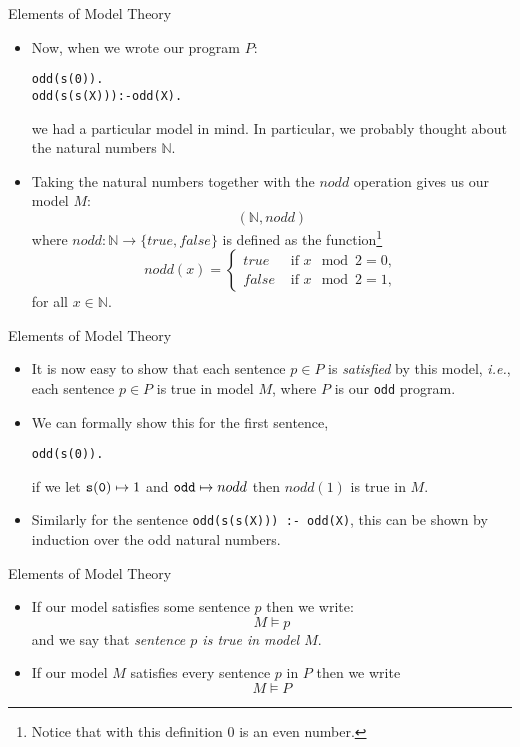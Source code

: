 \documentclass{beamer}
\begin{document}
\begin{frame}[fragile]{Elements of Model Theory}

\small
\begin{itemize}
\item 
Now, when we wrote our program $P$:
{\scriptsize
\begin{alltt}
odd(s(0)).
odd(s(s(X))) :- odd(X).
\end{alltt}
}
we had a particular model in mind.  In particular, we probably thought about the natural numbers $\mathbb{N}$.

\item
Taking the natural numbers together with the $nodd$ operation gives us our model $M$:
\[
(\mathbb{N}, nodd) %
\]
where $nodd : \mathbb{N} \rightarrow \{true,false\}$ is defined as the function\footnote{Notice that with this definition 0 is an even number.}
\[
nodd(x) = \left\{
\begin{array}{ll}
true & \mbox{ if $x\!\!\!\!\mod 2 = 0,$}\\
false & \mbox{ if $x\!\!\!\!\mod 2 = 1,$}
\end{array}
\right .
\]
for all $x\in\mathbb{N}$.
\end{itemize}
\end{frame}

\begin{frame}[fragile]{Elements of Model Theory}

\small
\begin{itemize}
\item
It is now easy to show that each sentence $p \in P$ is {\em satisfied} by this model, {\it i.e.}, 
each sentence $p\in P$ is true in model $M$, where $P$ is our {\tt odd} program.

\item
We can formally show this for the first sentence,
\begin{alltt}
odd(s(0)).
\end{alltt}
if we let ${\tt s(0)}\mapsto 1$ and ${\tt odd}\mapsto nodd$ then $nodd(1)$ is true in
$M$.  

\item Similarly for the sentence {\tt odd(s(s(X))) :- odd(X)}, this can be shown by induction over the odd natural numbers.
\end{itemize}
\end{frame}

\begin{frame}[fragile]{Elements of Model Theory}

\begin{itemize}
\item
 If our model satisfies some sentence $p$ then we write:
\[
M \models p
\]
and we say that {\em sentence $p$ is true in model $M$}.

\item
If our model $M$ satisfies every sentence $p$ in $P$ then we write
\[
M \models P
\]
\end{itemize}
\end{frame}
\end{document}
